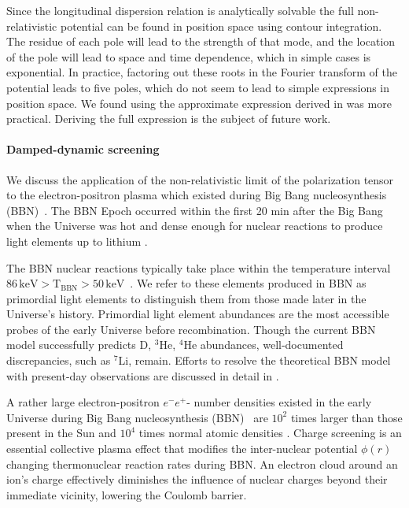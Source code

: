 Since the longitudinal dispersion relation is analytically solvable the full non-relativistic potential can be found in position space using contour integration. The residue of each pole will lead to the strength of that mode, and the location of the pole will lead to space and time dependence, which in simple cases is exponential. In practice, factoring out these roots in the Fourier transform of the potential leads to five poles, which do not seem to lead to simple expressions in position space. We found using the approximate expression derived in  was more practical. Deriving the full expression is the subject of future work.


\paragraph{Damped-dynamic screening} 
We discuss the application of the non-relativistic limit of the polarization tensor  to the electron-positron plasma which existed during Big Bang nucleosynthesis (BBN)~\cite{Grayson:2023flr}. The BBN Epoch occurred within the first 20 min after the Big Bang when the Universe was hot and dense enough for nuclear reactions to produce light elements up to lithium \cite{Pitrou:2018cgg}. 

The BBN nuclear reactions typically take place within the temperature interval $86\, \mathrm{keV}>\mathrm{T_{BBN}}>50\, \mathrm{keV}$~\cite{Pitrou:2018cgg}. We refer to these elements produced in BBN as primordial light elements to distinguish them from those made later in the Universe's history. Primordial light element abundances are the most accessible probes of the early Universe before recombination. Though the current BBN model successfully predicts D, $^3$He, $^4$He abundances, well-documented discrepancies, such as $^7$Li, remain. Efforts to resolve the theoretical BBN model with present-day observations are discussed in detail in \cite{Pitrou:2021vqr,Bertulani:2022qly}.

A rather large electron-positron $e^-e^+$- number densities existed in the early Universe during Big Bang nucleosynthesis (BBN)~\cite{Wang:2010px,Hwang:2021kno,Rafelski:2023emw} are $10^2$ times larger than those present in the Sun \cite{Bahcall:2001smc} and $10^4$ times normal atomic densities \cite{Grayson:2023flr}. Charge screening is an essential collective plasma effect that modifies the inter-nuclear potential $\phi(r)$ changing thermonuclear reaction rates during BBN. An electron cloud around an ion's charge effectively diminishes the influence of nuclear charges beyond their immediate vicinity, lowering the Coulomb barrier. 

